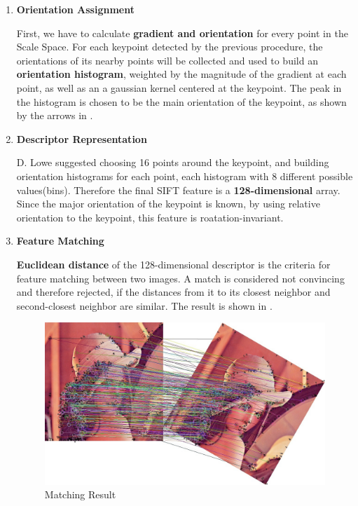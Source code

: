 \begin{enumerate}
  \item \textbf{Orientation Assignment}

    First, we have to calculate \textbf{gradient and orientation} for every point in the Scale Space.
    For each keypoint detected by the previous procedure,
    the orientations of its nearby points will be collected and used to build an \textbf{orientation histogram},
    weighted by the magnitude of the gradient at each point, as well as an a gaussian kernel centered at the keypoint.
    The peak in the histogram is chosen to be the main orientation of the keypoint, as shown by the arrows in .

  \item \textbf{Descriptor Representation}

    D. Lowe suggested choosing 16 points around the keypoint, and building orientation histograms for each point,
    each histogram with 8 different possible values(bins). Therefore the final SIFT feature is a \textbf{128-dimensional} array.
    Since the major orientation of the keypoint is known, by using relative orientation to the keypoint,
    this feature is roatation-invariant.

  \item \textbf{Feature Matching}

    \textbf{Euclidean distance} of the 128-dimensional descriptor is the criteria for feature matching between two images.
    A match is considered not convincing and therefore rejected,
    if the distances from it to its closest neighbor and second-closest neighbor are similar.
    The result is shown in .
    \begin{figure}[H]
      \centering
      \includegraphics[width=\textwidth]{res/match.jpg}
      \caption{Matching Result\label{fig:match}}
    \end{figure}



\end{enumerate}
